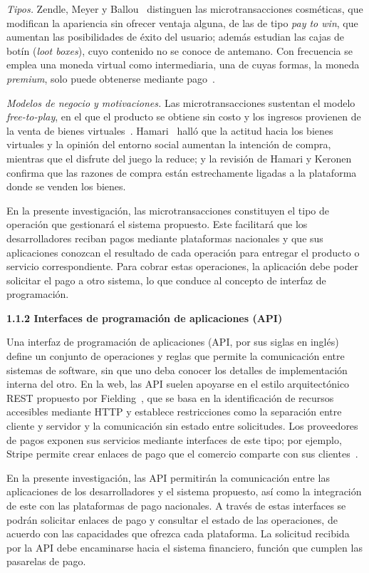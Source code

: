 \documentclass[12pt]{article}
\newcommand\vacio{\leavevmode\par}
\begin{document}
\textit{Tipos.} Zendle, Meyer y Ballou~\cite{zendle20} distinguen las microtransacciones cosméticas, que modifican la apariencia sin ofrecer ventaja alguna, de las de tipo \textit{pay to win}, que aumentan las posibilidades de éxito del usuario; además estudian las cajas de botín (\textit{loot boxes}), cuyo contenido no se conoce de antemano. Con frecuencia se emplea una moneda virtual como intermediaria, una de cuyas formas, la moneda \textit{premium}, solo puede obtenerse mediante pago~\cite{tomic}.

\textit{Modelos de negocio y motivaciones.} Las microtransacciones sustentan el modelo \textit{free-to-play}, en el que el producto se obtiene sin costo y los ingresos provienen de la venta de bienes virtuales~\cite{hamari15,tomic}. Hamari~\cite{hamari15} halló que la actitud hacia los bienes virtuales y la opinión del entorno social aumentan la intención de compra, mientras que el disfrute del juego la reduce; y la revisión de Hamari y Keronen~\cite{hamarik17} confirma que las razones de compra están estrechamente ligadas a la plataforma donde se venden los bienes.

En la presente investigación, las microtransacciones constituyen el tipo de operación que gestionará el sistema propuesto. Este facilitará que los desarrolladores reciban pagos mediante plataformas nacionales y que sus aplicaciones conozcan el resultado de cada operación para entregar el producto o servicio correspondiente. Para cobrar estas operaciones, la aplicación debe poder solicitar el pago a otro sistema, lo que conduce al concepto de interfaz de programación.

\vacio
\textbf{1.1.2 Interfaces de programación de aplicaciones (API)}

Una interfaz de programación de aplicaciones (API, por sus siglas en inglés) define un conjunto de operaciones y reglas que permite la comunicación entre sistemas de software, sin que uno deba conocer los detalles de implementación interna del otro. En la web, las API suelen apoyarse en el estilo arquitectónico REST propuesto por Fielding~\cite{fielding00}, que se basa en la identificación de recursos accesibles mediante HTTP y establece restricciones como la separación entre cliente y servidor y la comunicación sin estado entre solicitudes. Los proveedores de pagos exponen sus servicios mediante interfaces de este tipo; por ejemplo, Stripe permite crear enlaces de pago que el comercio comparte con sus clientes~\cite{stripelinks}.

En la presente investigación, las API permitirán la comunicación entre las aplicaciones de los desarrolladores y el sistema propuesto, así como la integración de este con las plataformas de pago nacionales. A través de estas interfaces se podrán solicitar enlaces de pago y consultar el estado de las operaciones, de acuerdo con las capacidades que ofrezca cada plataforma. La solicitud recibida por la API debe encaminarse hacia el sistema financiero, función que cumplen las pasarelas de pago.
\end{document}
